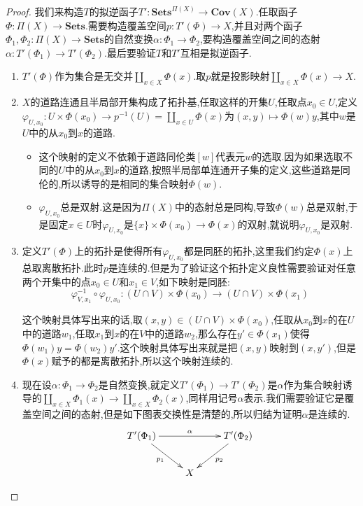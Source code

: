 \begin{enumerate}
\begin{proof}
		我们来构造$T$的拟逆函子$T':\textbf{Sets}^{\Pi(X)}\to\textbf{Cov}(X)$.任取函子$\Phi:\Pi(X)\to\textbf{Sets}$.需要构造覆盖空间$p:T'(\Phi)\to X$,并且对两个函子$\Phi_1,\Phi_2:\Pi(X)\to\textbf{Sets}$的自然变换$\alpha:\Phi_1\to\Phi_2$,要构造覆盖空间之间的态射$\alpha:T'(\Phi_1)\to T'(\Phi_2)$.最后要验证$T$和$T'$互相是拟逆函子.
		\begin{enumerate}
			\item $T'(\Phi)$作为集合是无交并$\coprod_{x\in X}\Phi(x)$.取$p$就是投影映射$\coprod_{x\in X}\Phi(x)\to X$.
			\item $X$的道路连通且半局部开集构成了拓扑基,任取这样的开集$U$,任取点$x_0\in U$,定义$\varphi_{U,x_0}:U\times\Phi(x_0)\to p^{-1}(U)=\coprod_{x\in U}\Phi(x)$为$(x,y)\mapsto\Phi(w)y$,其中$w$是$U$中的从$x_0$到$x$的道路.
			\begin{itemize}
				\item 这个映射的定义不依赖于道路同伦类$[w]$代表元$w$的选取.因为如果选取不同的$U$中的从$x_0$到$x$的道路,按照半局部单连通开子集的定义,这些道路是同伦的,所以诱导的是相同的集合映射$\Phi(w)$.
				\item $\varphi_{U,x_0}$总是双射.这是因为$\Pi(X)$中的态射总是同构,导致$\Phi(w)$总是双射,于是固定$x\in U$时$\varphi_{U,x_0}$是$\{x\}\times\Phi(x_0)\to\Phi(x)$的双射,就说明$\varphi_{U,x_0}$是双射.
			\end{itemize}
			\item 定义$T'(\Phi)$上的拓扑是使得所有$\varphi_{U,x_0}$都是同胚的拓扑,这里我们约定$\Phi(x)$上总取离散拓扑.此时$p$是连续的.但是为了验证这个拓扑定义良性需要验证对任意两个开集中的点$x_0\in U$和$x_1\in V$,如下映射是同胚:
			$$\varphi_{V,x_1}^{-1}\circ\varphi_{U,x_0}:(U\cap V)\times\Phi(x_0)\to(U\cap V)\times\Phi(x_1)$$
			
			这个映射具体写出来的话,取$(x,y)\in(U\cap V)\times\Phi(x_0)$,任取从$x_0$到$x$的在$U$中的道路$w_1$,任取$x_1$到$x$的在$V$中的道路$w_2$,那么存在$y'\in\Phi(x_1)$使得$\Phi(w_1)y=\Phi(w_2)y'$.这个映射具体写出来就是把$(x,y)$映射到$(x,y')$,但是$\Phi(x)$赋予的都是离散拓扑,所以这个映射连续的.
			\item 现在设$\alpha:\Phi_1\to\Phi_2$是自然变换,就定义$T'(\Phi_1)\to T'(\Phi_2)$是$\alpha$作为集合映射诱导的$\coprod_{x\in X}\Phi_1(x)\to\coprod_{x\in X}\Phi_2(x)$,同样用记号$\alpha$表示.我们需要验证它是覆盖空间之间的态射,但是如下图表交换性是清楚的,所以归结为证明$\alpha$是连续的.
			$$\xymatrix{T'(\Phi_1)\ar[dr]_{p_1}\ar[rr]^{\alpha}&&T'(\Phi_2)\ar[dl]^{p_2}\\&X&}$$
			

\end{enumerate}
\end{proof}
\end{enumerate}
